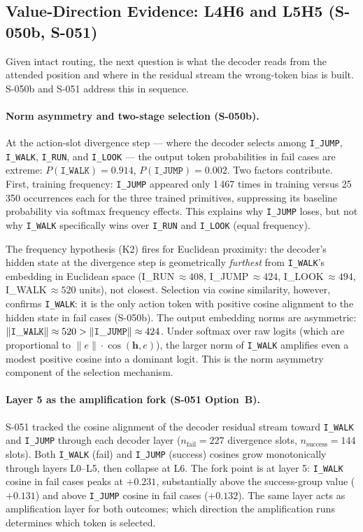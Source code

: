 \subsection{Value-Direction Evidence: L4H6 and L5H5 (S-050b, S-051)}

Given intact routing, the next question is what the decoder reads from the attended
position and where in the residual stream the wrong-token bias is built.
S-050b and S-051 address this in sequence.

\paragraph{Norm asymmetry and two-stage selection (S-050b).}
At the action-slot divergence step --- where the decoder selects among
\texttt{I\_JUMP}, \texttt{I\_WALK}, \texttt{I\_RUN}, and \texttt{I\_LOOK} ---
the output token probabilities in fail cases are extreme:
$P(\texttt{I\_WALK}) = 0.914$, $P(\texttt{I\_JUMP}) = 0.002$.
Two factors contribute.
First, training frequency: \texttt{I\_JUMP} appeared only 1\,467 times in training
versus 25\,350 occurrences each for the three trained primitives, suppressing its
baseline probability via softmax frequency effects.
This explains why \texttt{I\_JUMP} loses, but not why \texttt{I\_WALK} specifically
wins over \texttt{I\_RUN} and \texttt{I\_LOOK} (equal frequency).

The frequency hypothesis (K2) fires for Euclidean proximity:
the decoder's hidden state at the divergence step is geometrically \emph{furthest}
from \texttt{I\_WALK}'s embedding in Euclidean space
(I\_RUN\,$\approx 408$, I\_JUMP\,$\approx 424$, I\_LOOK\,$\approx 494$,
I\_WALK\,$\approx 520$ units), not closest.
Selection via cosine similarity, however, confirms \texttt{I\_WALK}:
it is the only action token with positive cosine alignment to the hidden state in fail
cases (S-050b).
The output embedding norms are asymmetric:
$\|{\tt I\_WALK}\| \approx 520 > \|{\tt I\_JUMP}\| \approx 424$.
Under softmax over raw logits (which are proportional to
${\|e\|}\cdot\cos(\mathbf{h}, e)$), the larger norm of \texttt{I\_WALK} amplifies
even a modest positive cosine into a dominant logit.
This is the norm asymmetry component of the selection mechanism.

\paragraph{Layer 5 as the amplification fork (S-051 Option~B).}
S-051 tracked the cosine alignment of the decoder residual stream toward
\texttt{I\_WALK} and \texttt{I\_JUMP} through each decoder layer
($n_\text{fail} = 227$ divergence slots, $n_\text{success} = 144$ slots).
Both \texttt{I\_WALK} (fail) and \texttt{I\_JUMP} (success) cosines grow monotonically
through layers L0--L5, then collapse at L6.
The fork point is at layer 5:
\texttt{I\_WALK} cosine in fail cases peaks at $+0.231$,
substantially above the success-group value ($+0.131$) and above
\texttt{I\_JUMP} cosine in fail cases ($+0.132$).
The same layer acts as amplification layer for both outcomes; which direction the
amplification runs determines which token is selected.


